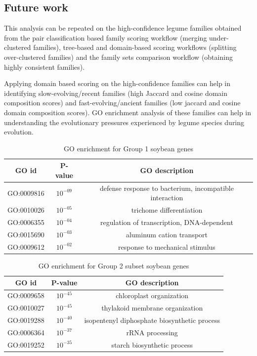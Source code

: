 \documentclass{article}
\begin{document}
		\subsection{Future work}
		This analysis can be repeated on the high-confidence legume families obtained from the pair classification based family scoring workflow (merging under-clustered families), tree-based and domain-based scoring workflows (splitting over-clustered families) and the family sets comparison workflow (obtaining highly consistent families). 
		
		Applying domain based scoring on the high-confidence families can help in identifying slow-evolving/recent families (high Jaccard and cosine domain composition scores) and fast-evolving/ancient families (low jaccard and cosine domain composition scores). GO enrichment analysis of these families can help in understanding the evolutionary pressures experienced by legume species during evolution.
		
		\begin{table}[h!]
			\centering
			\begin{tabular}{|c |c |c |} 
				\hline
				GO id & P-value & GO description \\
				\hline\hline
				GO:0009816 & $10^{-09}$ & defense response to bacterium, incompatible interaction \\ 
				\hline
				GO:0010026 & $10^{-05}$ & trichome differentiation \\
				\hline
				GO:0006355 & $10^{-04}$ & regulation of transcription, DNA-dependent \\
				\hline
				GO:0015690 & $10^{-03}$ & aluminum cation transport \\
				\hline
				GO:0009612 & $10^{-02}$ & response to mechanical stimulus \\ 
				\hline
			\end{tabular}
			\caption{GO enrichment for Group 1 soybean genes}
			\label{tab:gotable_group1}
		\end{table}
		
		\begin{table}[h!]
			\centering
			\begin{tabular}{|c |c |c |} 
				\hline
				GO id & P-value & GO description \\
				\hline\hline
				GO:0009658 & $10^{-45}$ & chloroplast organization \\ 
				\hline
				GO:0010027 & $10^{-45}$ & thylakoid membrane organization \\
				\hline
				GO:0019288 & $10^{-40}$ & isopentenyl diphosphate biosynthetic process \\
				\hline
				GO:0006364 & $10^{-37}$ & rRNA processing \\
				\hline
				GO:0019252 & $10^{-35}$ & starch biosynthetic process \\ 
				\hline
			\end{tabular}
			\caption{GO enrichment for Group 2 subset soybean genes}
			\label{tab:gotable_group2_subset}
		\end{table}
		
\end{document}
